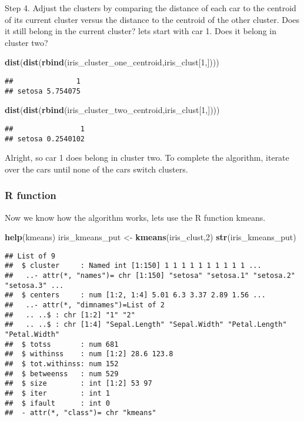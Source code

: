\documentclass[11pt,]{article}
\newenvironment{Shaded}{\begin{snugshade}}{\end{snugshade}}
\newcommand{\DecValTok}[1]{\textcolor[rgb]{0.00,0.00,0.81}{#1}}
\newcommand{\KeywordTok}[1]{\textcolor[rgb]{0.13,0.29,0.53}{\textbf{#1}}}
\newcommand{\NormalTok}[1]{#1}
\newcommand{\StringTok}[1]{\textcolor[rgb]{0.31,0.60,0.02}{#1}}
\begin{document}
Step 4. Adjust the clusters by comparing the distance of each car to the
centroid of its current cluster versus the distance to the centroid of
the other cluster. Does it still belong in the current cluster? lets
start with car 1. Does it belong in cluster two?

\begin{Shaded}
\begin{Highlighting}[]
\KeywordTok{dist}\NormalTok{(}\KeywordTok{dist}\NormalTok{(}\KeywordTok{rbind}\NormalTok{(iris_cluster_one_centroid,iris_clust[}\DecValTok{1}\NormalTok{,])))}
\end{Highlighting}
\end{Shaded}

\begin{verbatim}
##               1
## setosa 5.754075
\end{verbatim}

\begin{Shaded}
\begin{Highlighting}[]
\KeywordTok{dist}\NormalTok{(}\KeywordTok{dist}\NormalTok{(}\KeywordTok{rbind}\NormalTok{(iris_cluster_two_centroid,iris_clust[}\DecValTok{1}\NormalTok{,])))}
\end{Highlighting}
\end{Shaded}

\begin{verbatim}
##                1
## setosa 0.2540102
\end{verbatim}

Alright, so car 1 does belong in cluster two. To complete the algorithm,
iterate over the cars until none of the cars switch clusters.

\hypertarget{r-function-1}{%
\subsubsection{R function}\label{r-function-1}}

Now we know how the algorithm works, lets use the R function kmeans.

\begin{Shaded}
\begin{Highlighting}[]
\KeywordTok{help}\NormalTok{(kmeans)}
\NormalTok{iris_kmeans_put <-}\StringTok{ }\KeywordTok{kmeans}\NormalTok{(iris_clust,}\DecValTok{2}\NormalTok{)}
\KeywordTok{str}\NormalTok{(iris_kmeans_put)}
\end{Highlighting}
\end{Shaded}

\begin{verbatim}
## List of 9
##  $ cluster     : Named int [1:150] 1 1 1 1 1 1 1 1 1 1 ...
##   ..- attr(*, "names")= chr [1:150] "setosa" "setosa.1" "setosa.2" "setosa.3" ...
##  $ centers     : num [1:2, 1:4] 5.01 6.3 3.37 2.89 1.56 ...
##   ..- attr(*, "dimnames")=List of 2
##   .. ..$ : chr [1:2] "1" "2"
##   .. ..$ : chr [1:4] "Sepal.Length" "Sepal.Width" "Petal.Length" "Petal.Width"
##  $ totss       : num 681
##  $ withinss    : num [1:2] 28.6 123.8
##  $ tot.withinss: num 152
##  $ betweenss   : num 529
##  $ size        : int [1:2] 53 97
##  $ iter        : int 1
##  $ ifault      : int 0
##  - attr(*, "class")= chr "kmeans"
\end{verbatim}
\end{document}
